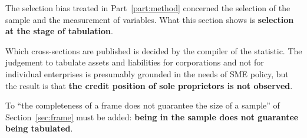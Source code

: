 \begin{remark}
\label{rem:tabulation-choice}
The selection bias treated in Part~\ref{part:method} concerned the selection of the sample and the
measurement of variables. What this section shows is \textbf{selection at the stage of
tabulation}.

Which cross-sections are published is decided by the compiler of the statistic. The judgement to
tabulate assets and liabilities for corporations and not for individual enterprises is presumably
grounded in the needs of SME policy, but the result is that \textbf{the credit position of sole
proprietors is not observed}.

To ``the completeness of a frame does not guarantee the size of a sample'' of
Section~\ref{sec:frame} must be added: \textbf{being in the sample does not guarantee being
tabulated}.
\end{remark}
